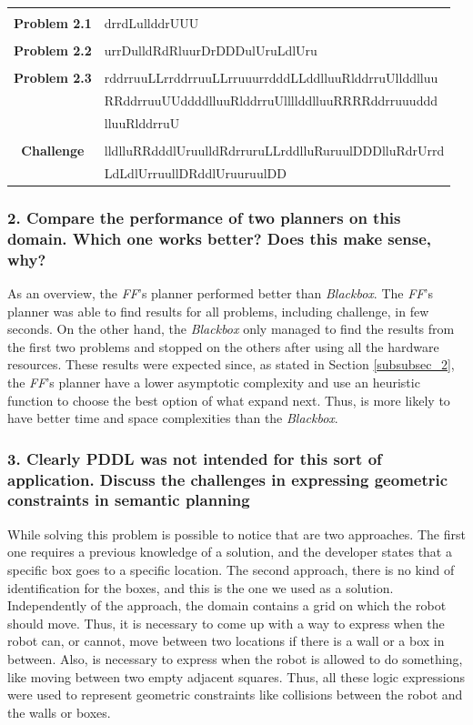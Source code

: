 \documentclass[10pt, letter]{article}
\begin{document}
\begin{tabular}{ c l }
  &\\
  \textbf{Problem 2.1} & drrdLullddrUUU\\
  &\\
  \textbf{Problem 2.2} & urrDulldRdRluurDrDDDulUruLdlUru\\
  &\\
  \textbf{Problem 2.3} & rddrruuLLrrddrruuLLrruuurrdddLLddlluuRlddrruUllddlluu\\
                       & RRddrruuUUddddlluuRlddrruUllllddlluuRRRRddrruuuddd\\
                       & lluuRlddrruU\\
  &\\
  \textbf{Challenge}   & lldlluRRdddlUruulldRdrruruLLrddlluRuruulDDDlluRdrUrrd\\
                       & LdLdlUrruullDRddlUruuruulDD\\
\end{tabular}

\subsubsection*{2. Compare the performance of two planners on this domain. Which one works better? Does this
make sense, why?}

As an overview, the \textit{FF}'s planner performed better than \textit{Blackbox}. The \textit{FF}'s planner was able to find results for all problems, including challenge, in few seconds. On the other hand, the \textit{Blackbox} only managed to find the results from the first two problems and stopped on the others after using all the hardware resources. These results were expected since, as stated in Section \ref{subsubsec_2}, the \textit{FF}'s planner have a lower asymptotic complexity and use an heuristic function to choose the best option of what expand next. Thus, is more likely to have better time and space complexities than the \textit{Blackbox}.

\subsubsection*{3. Clearly PDDL was not intended for this sort of application. Discuss the challenges in expressing geometric constraints in semantic planning}

While solving this problem is possible to notice that are two approaches. The first one requires a previous knowledge of a solution, and the developer states that a specific box goes to a specific location. The second approach, there is no kind of identification for the boxes, and this is the one we used as a solution. Independently of the approach, the domain contains a grid on which the robot should move. Thus, it is necessary to come up with a way to express when the robot can, or cannot, move between two locations if there is a wall or a box in between. Also, is necessary to express when the robot is allowed to do something, like moving between two empty adjacent squares. Thus, all these logic expressions were used to represent geometric constraints like collisions between the robot and the walls or boxes.
\end{document}
